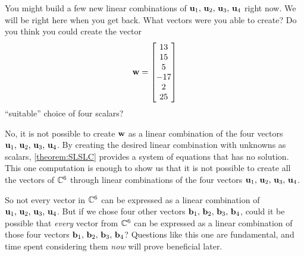 \documentclass{ximera}
\begin{document}
\begin{example}
  \begin{question}
    You might build a
    few new linear combinations of
    $\mathbf{u}_1,\,\mathbf{u}_2,\,\mathbf{u}_3,\,\mathbf{u}_4$ right now.  We
    will be right here when you get back.  What vectors were you able to
    create?  Do you think you could create the vector 
    \[\mathbf{w}=\begin{bmatrix}13\\15\\5\\-17\\2\\25\end{bmatrix}\]
    ``suitable'' choice of four scalars?
  
    \begin{multipleChoice}
    \end{multipleChoice}

    \begin{feedback}[correct]
      No, it is not possible to create $\mathbf{w}$ as a linear
      combination of the four vectors
      $\mathbf{u}_1,\,\mathbf{u}_2,\,\mathbf{u}_3,\,\mathbf{u}_4$.  By
      creating the desired linear combination with unknowns as
      scalars, \ref{theorem:SLSLC} provides a system of equations that
      has no solution.  This one computation is enough to show us that
      it is not possible to create all the vectors of $\mathbb{C}^{6}$
      through linear combinations of the four vectors
      $\mathbf{u}_1,\,\mathbf{u}_2,\,\mathbf{u}_3,\,\mathbf{u}_4$.

      So not every vector in $\mathbb{C}^{6}$ can be expressed as a
      linear combination of
      $\mathbf{u}_1,\,\mathbf{u}_2,\,\mathbf{u}_3,\,\mathbf{u}_4$.  But if we
      chose four other vectors
      $\mathbf{b}_1,\,\mathbf{b}_2,\,\mathbf{b}_3,\,\mathbf{b}_4$, could it be
      possible that \textit{every} vector from $\mathbb{C}^{6}$ can be
      expressed as a linear combination of those four vectors
      $\mathbf{b}_1,\,\mathbf{b}_2,\,\mathbf{b}_3,\,\mathbf{b}_4$?  Questions
      like this one are fundamental, and time spent considering them
      \textit{now} will prove beneficial later.
    \end{feedback}
  \end{question}

\end{example}
\end{document}

